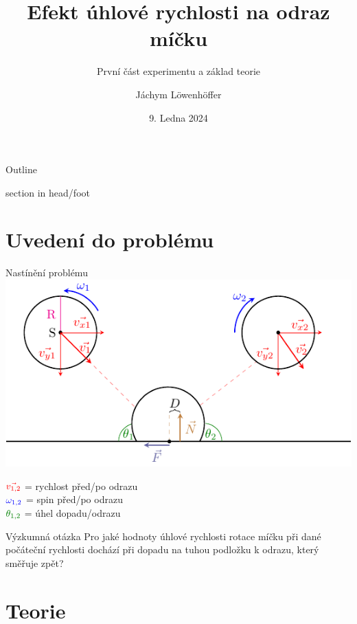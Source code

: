 \documentclass[secheader]{beamer}
\title[Odraz spinujícího míčku]{Efekt úhlové rychlosti na odraz míčku}
\subtitle{První část experimentu a základ teorie}
\author[Jáchym L.]{Jáchym Löwenhöffer}
\institute[]{GEVO JM}
\date{9. Ledna 2024}
\begin{document}
  \begin{frame}
  \titlepage
 \end{frame}

 \begin{frame}{Outline}
  \tableofcontents
 \end{frame}

{%
\begin{beamercolorbox}{section in head/foot}
\vskip1pt\insertnavigation{\paperwidth}\vskip2pt
\end{beamercolorbox}%
}

 \section{Uvedení do problému}
 
 \begin{frame}{Nastínění problému}
  \centering
  \includegraphics{diagram.pdf}\\
  \raggedright
  $\color{red}\vec{v_{1,2}}$ = rychlost před/po odrazu \\
  $\color{blue}\omega_{1,2}$ = spin před/po odrazu \\
  $\color[rgb]{0,0.5,0}\theta_{1,2}$ = úhel dopadu/odrazu \\
  
 \end{frame}

 \begin{frame}{Výzkumná otázka}
  \centering
  Pro jaké hodnoty úhlové rychlosti rotace míčku při dané počáteční rychlosti
 dochází při dopadu na tuhou podložku k odrazu, který směřuje zpět?
 \end{frame}

 \section{Teorie} 
\end{document}
